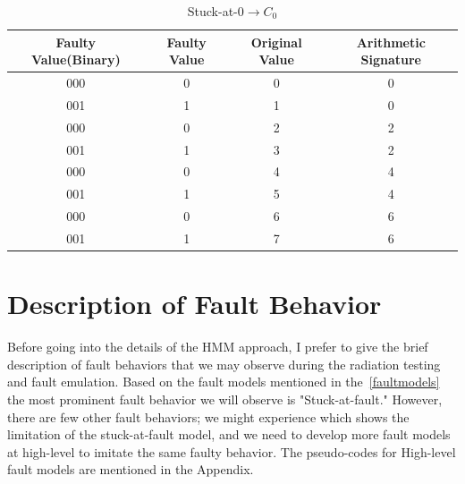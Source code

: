 \begin{table}[tb!]
\center
\caption{Stuck-at-0$\rightarrow C_0$}

\label{c@0-c0}

\begin{tabular}{|c | c| c | c| } 
 \hline
 \rowcolor{lightgray}
Faulty Value(Binary) & Faulty Value & Original Value & Arithmetic Signature   \\ 
\hline

 
 
 000& 0 &0 & 0  \\
 \hline
 001 & 1 & 1 & 0 \\ 
 \hline
 
 000 & 0 & 2 & 2 \\
 \hline
 001& 1& 3& 2 \\
 \hline
 000 & 0  &  4& 4 \\
 \hline
 001 & 1 & 5 &4  \\
 \hline
 000 & 0 & 6 & 6 \\
 \hline
 001 & 1 & 7 & 6 \\
 \hline
 
 
\end{tabular}
\end{table}

\section{Description of Fault Behavior}

Before going into the details of the HMM approach, I prefer to give the brief description of fault behaviors that we may observe during the radiation testing and fault emulation. Based on the fault models mentioned in the~\ref{faultmodels} the most prominent fault behavior we will observe is "Stuck-at-fault." However, there are few other fault behaviors; we might experience which shows the limitation of the stuck-at-fault model, and we need to develop more fault models at high-level to imitate the same faulty behavior. The pseudo-codes for High-level fault models are mentioned in the Appendix.

